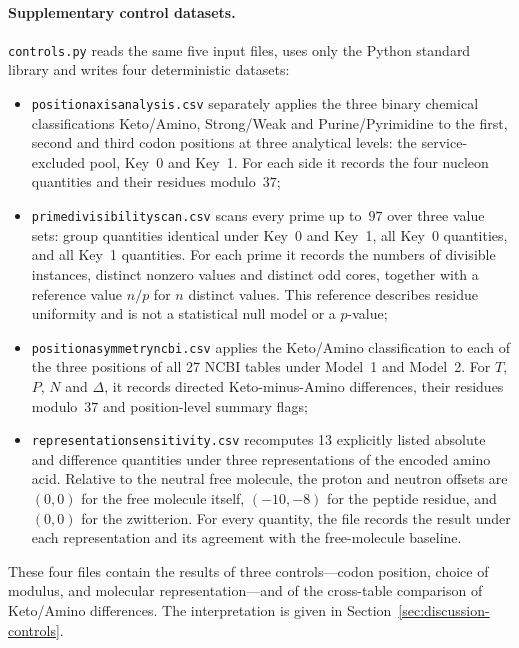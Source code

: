 \documentclass[11pt,a4paper]{article}
\renewcommand{\_}{\origunderscore\allowbreak}
\begin{document}
\paragraph{Supplementary control datasets.}
\texttt{controls.py} reads the same five input files, uses only the
Python standard library and writes four deterministic datasets:
\begin{itemize}
  \item \texttt{position\_axis\_analysis.csv} separately applies
        the three binary chemical classifications Keto/Amino,
        Strong/Weak and Purine/Pyrimidine to the first, second and
        third codon positions at three analytical levels:
        the service-excluded pool, Key~0 and Key~1. For each side it
        records the four nucleon quantities and their residues
        modulo~$37$;
  \item \texttt{prime\_divisibility\_scan.csv} scans every prime up
        to~$97$ over three value sets: group quantities identical under
        Key~0 and Key~1, all Key~0 quantities, and all Key~1
        quantities. For each prime it records the numbers of
        divisible instances, distinct nonzero values and distinct odd
        cores, together with a reference value $n/p$ for $n$ distinct
        values. This reference describes residue uniformity and is not
        a statistical null model or a $p$-value;
  \item \texttt{position\_asymmetry\_ncbi.csv} applies the
        Keto/Amino classification to each of the three positions of
        all 27 NCBI tables under Model~1 and Model~2. For $T$,
        $P$, $N$ and
        $\Delta$, it records directed Keto-minus-Amino differences,
        their residues modulo~$37$ and position-level summary flags;
  \item \texttt{representation\_sensitivity.csv} recomputes 13
        explicitly listed absolute and difference quantities under
        three representations of the encoded amino acid. Relative to
        the neutral free molecule, the proton and neutron offsets are
        $(0,0)$ for the free molecule itself, $(-10,-8)$ for the
        peptide residue, and $(0,0)$ for the zwitterion. For every
        quantity, the file records the result under each representation
        and its agreement with the free-molecule baseline.
\end{itemize}
These four files contain the results of three controls---codon
position, choice of modulus, and molecular representation---and
of the cross-table comparison of Keto/Amino differences.
The interpretation is given in
Section~\ref{sec:discussion-controls}.
\end{document}
